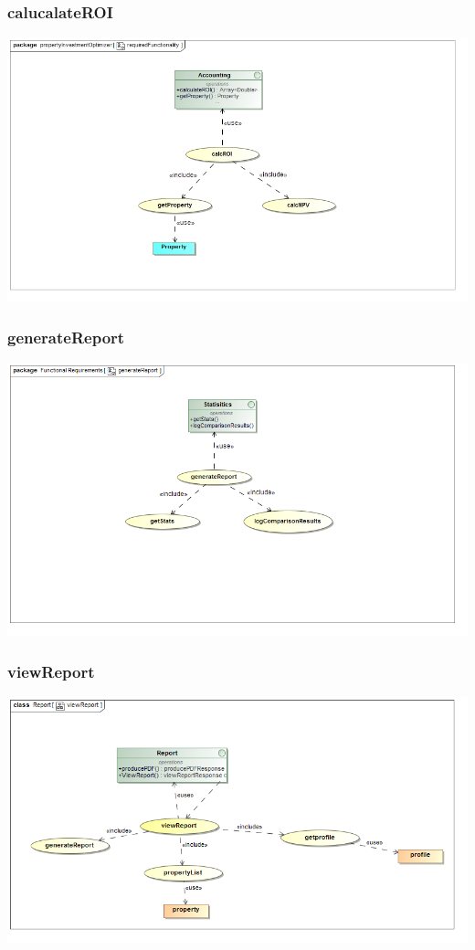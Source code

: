 \documentclass[a4paper,12pt]{article}
\begin{document}
\subsubsection{calucalateROI}
\includegraphics[width=1\textwidth]{./Images/newDiagrams/requiredFunctionality/Priscilla/requiredFunctionalityROI.jpg}

\subsubsection{generateReport}
\includegraphics[width=1\textwidth]{./Images/requiredFunctionality/generateReport.png}
\subsubsection{viewReport}
\includegraphics[width=1\textwidth]{./Images/newDiagrams/requiredFunctionality/Sandile/viewReportFR.png}
\end{document}
